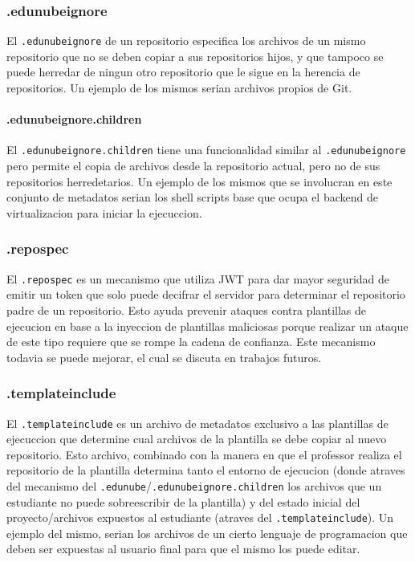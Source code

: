 \subsubsection{.edunubeignore}
El \texttt{.edunubeignore} de un repositorio especifica los archivos de un mismo repositorio que no se deben copiar a sus repositorios hijos, y que tampoco se puede herredar de ningun otro repositorio que le sigue en la herencia de repositorios. Un ejemplo de los mismos serian archivos propios de Git.
\paragraph{.edunubeignore.children}
El \texttt{.edunubeignore.children} tiene una funcionalidad similar al \texttt{.edunubeignore} pero permite el copia de archivos desde la repositorio actual, pero no de sus repositorios herredetarios. Un ejemplo de los mismos que se involucran en este conjunto de metadatos serian los shell scripts base que ocupa el backend de virtualizacion para iniciar la ejecuccion.
\subsubsection{.repospec}
El \texttt{.repospec} es un mecanismo que utiliza JWT para dar mayor seguridad de emitir un token que solo puede decifrar el servidor para determinar el repositorio padre de un repositorio. Esto ayuda prevenir ataques contra plantillas de ejecucion en base a la inyeccion de plantillas maliciosas porque realizar un ataque de este tipo requiere que se rompe la cadena de confianza. Este mecanismo todavia se puede mejorar, el cual se discuta en trabajos futuros.
\subsubsection{.templateinclude}
El \texttt{.templateinclude} es un archivo de metadatos exclusivo a las plantillas de ejecuccion que determine cual archivos de la plantilla se debe copiar al nuevo repositorio. Esto archivo, combinado con la manera en que el professor realiza el repositorio de la plantilla determina tanto el entorno de ejecucion (donde atraves del mecanismo del \texttt{.edunube}/\texttt{.edunubeignore.children} los archivos que un estudiante no puede sobreescribir de la plantilla) y del estado inicial del proyecto/archivos expuestos al estudiante (atraves del \texttt{.templateinclude}). Un ejemplo del mismo, serian los archivos de un cierto lenguaje de programacion que deben ser expuestas al usuario final para que el mismo los puede editar.

